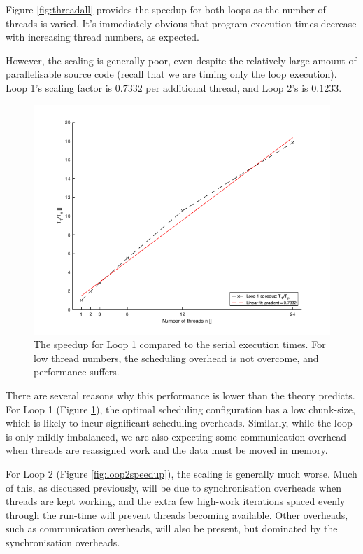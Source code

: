 \documentclass{article} %
\begin{document}
Figure \ref{fig:threadall} provides the speedup for both loops as the number of threads is varied.
It's immediately obvious that program execution times decrease with increasing thread numbers, as expected.

However, the scaling is generally poor, even despite the relatively large amount of parallelisable source code (recall that we are timing only the loop execution).
Loop 1's scaling factor is $0.7332$ per additional thread, and Loop 2's is $0.1233$. 

\begin{figure}
    \centering
    \includegraphics[height=.35\textheight]{part1_plots/loop1_speedup.png}
    \caption{The speedup for Loop 1 compared to the serial execution times. For low thread numbers, the scheduling overhead is not overcome, and performance suffers.}
    \label{fig:loop1speedup}
\end{figure}

There are several reasons why this performance is lower than the theory predicts. 
For Loop 1 (Figure \ref{fig:loop1speedup}), the optimal scheduling configuration has a low chunk-size, which is likely to incur significant scheduling overheads.
Similarly, while the loop is only mildly imbalanced, we are also expecting some communication overhead when threads are reassigned work and the data must be moved in memory.

For Loop 2 (Figure \ref{fig:loop2speedup}), the scaling is generally much worse.
Much of this, as discussed previously, will be due to synchronisation overheads when threads are kept working, and the extra few high-work iterations spaced evenly through the run-time will prevent threads becoming available.
Other overheads, such as communication overheads, will also be present, but dominated by the synchronisation overheads.
\end{document}
